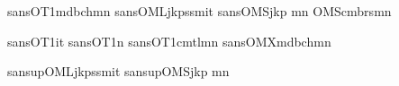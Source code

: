 






\makeatletter
\newif\ifkp@upRm
\newif\ifkp@osm
\newif\ifkp@vosm
\makeatother


   {sans}{OT1}{mdbch}{m}{n}
     {sans}{OML}{jkpss}{m}{it}
     {sans}{OMS}{jkp}  {m}{n}
  {OMS}{cmbrs}{m}{n}

\SetMathAlphabet{\mathit} {sans}{OT1}{\savesffamily}{\savesfmdseries}{it}
\SetMathAlphabet{\mathbf} {sans}{OT1}{\savesffamily}{\savesfbfseries}{n}
\SetMathAlphabet{\mathtt} {sans}{OT1}{cmtl}{m}{n}
 {sans}{OMX}{mdbch}{m}{n}

  {sansup}{OML}{jkpss}{m}{it}
  {sansup}{OMS}{jkp}  {m}{n}


